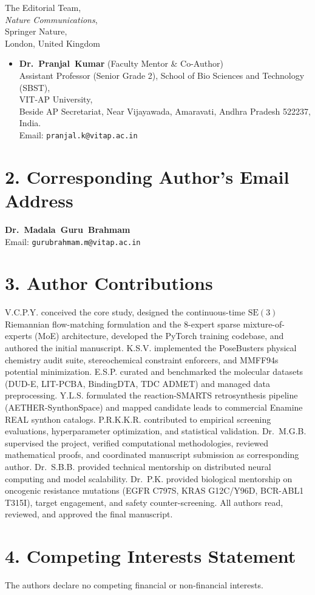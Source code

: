 \documentclass[11pt]{letter}
\begin{document}
\begin{letter}{%
    The Editorial Team,\\
    \textit{Nature Communications},\\
    Springer Nature,\\
    London, United Kingdom
}
\begin{itemize}
    \item \textbf{Dr.~Pranjal~Kumar} (Faculty Mentor \& Co-Author)\\
    Assistant Professor (Senior Grade 2), School of Bio Sciences and Technology (SBST),\\
    VIT-AP University,\\
    Beside AP Secretariat, Near Vijayawada, Amaravati, Andhra Pradesh 522237, India.\\
    Email: \texttt{pranjal.k@vitap.ac.in}
\end{itemize}

\section*{2. Corresponding Author's Email Address}
\textbf{Dr.~Madala~Guru~Brahmam}\\
Email: \texttt{gurubrahmam.m@vitap.ac.in}

\section*{3. Author Contributions}
V.C.P.Y. conceived the core study, designed the continuous-time $\mathrm{SE}(3)$ Riemannian flow-matching formulation and the 8-expert sparse mixture-of-experts (MoE) architecture, developed the PyTorch training codebase, and authored the initial manuscript. K.S.V. implemented the PoseBusters physical chemistry audit suite, stereochemical constraint enforcers, and MMFF94s potential minimization. E.S.P. curated and benchmarked the molecular datasets (DUD-E, LIT-PCBA, BindingDTA, TDC ADMET) and managed data preprocessing. Y.L.S. formulated the reaction-SMARTS retrosynthesis pipeline (AETHER-SynthonSpace) and mapped candidate leads to commercial Enamine REAL synthon catalogs. P.R.K.K.R. contributed to empirical screening evaluations, hyperparameter optimization, and statistical validation. Dr.~M.G.B. supervised the project, verified computational methodologies, reviewed mathematical proofs, and coordinated manuscript submission as corresponding author. Dr.~S.B.B. provided technical mentorship on distributed neural computing and model scalability. Dr.~P.K. provided biological mentorship on oncogenic resistance mutations (EGFR C797S, KRAS G12C/Y96D, BCR-ABL1 T315I), target engagement, and safety counter-screening. All authors read, reviewed, and approved the final manuscript.

\section*{4. Competing Interests Statement}
The authors declare no competing financial or non-financial interests.


\end{letter}
\end{document}
